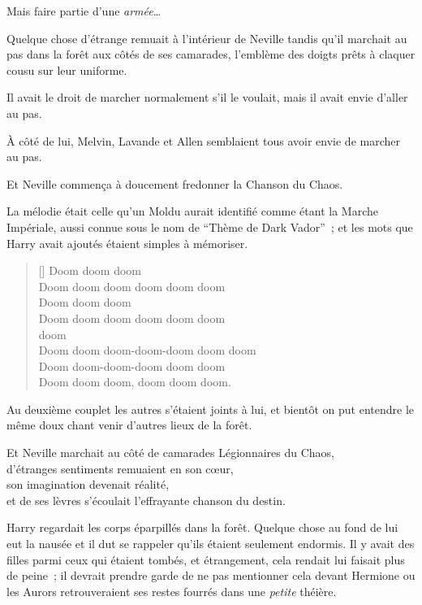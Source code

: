Mais faire partie d'une \emph{armée}…

Quelque chose d'étrange remuait à l'intérieur de Neville tandis qu'il marchait au pas dans la forêt aux côtés de ses camarades, l'emblème des doigts prêts à claquer cousu sur leur uniforme.

Il avait le droit de marcher normalement s'il le voulait, mais il avait envie d'aller au pas.

À côté de lui, Melvin, Lavande et Allen semblaient tous avoir envie de marcher au pas.

Et Neville commença à doucement fredonner la Chanson du Chaos.

La mélodie était celle qu'un Moldu aurait identifié comme étant la Marche Impériale, aussi connue sous le nom de “Thème de Dark Vador”~; et les mots que Harry avait ajoutés étaient simples à mémoriser.
\baselineskip\settowidth{\versewidth}{Doom doom doom-doom-doom doom doom} \begin{verse}[\versewidth] Doom doom doom\\ Doom doom doom doom doom doom\\ Doom doom doom\\ Doom doom doom doom doom doom\\  doom \\ Doom doom doom-doom-doom doom doom\\ Doom doom-doom-doom doom doom\\ Doom doom doom, doom doom doom. \end{verse}\baselineskip

Au deuxième couplet les autres s'étaient joints à lui, et bientôt on put entendre le même doux chant venir d'autres lieux de la forêt.

Et Neville marchait au côté de camarades Légionnaires du Chaos,\\ d'étranges sentiments remuaient en son cœur,\\ son imagination devenait réalité,\\ et de ses lèvres s'écoulait l'effrayante chanson du destin.

\later

Harry regardait les corps éparpillés dans la forêt. Quelque chose au fond de lui eut la nausée et il dut se rappeler qu'ils étaient seulement endormis. Il y avait des filles parmi ceux qui étaient tombés, et étrangement, cela rendait lui faisait plus de peine~; il devrait prendre garde de ne pas mentionner cela devant Hermione ou les Aurors retrouveraient ses restes fourrés dans une \emph{petite} théière.

